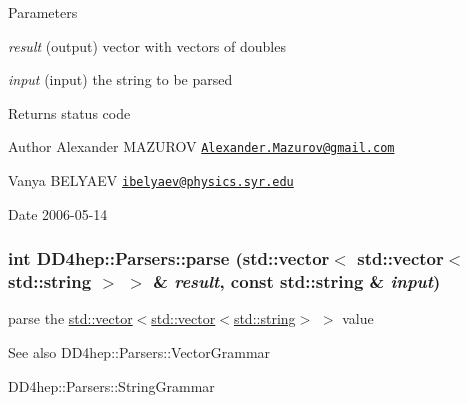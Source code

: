 \begin{DoxyParams}{Parameters}
\item[{\em result}](output) vector with vectors of doubles \item[{\em input}](input) the string to be parsed \end{DoxyParams}
\begin{DoxyReturn}{Returns}
status code
\end{DoxyReturn}
\begin{DoxyAuthor}{Author}
Alexander MAZUROV \href{mailto:Alexander.Mazurov@gmail.com}{\tt Alexander.Mazurov@gmail.com} 

Vanya BELYAEV \href{mailto:ibelyaev@physics.syr.edu}{\tt ibelyaev@physics.syr.edu} 
\end{DoxyAuthor}
\begin{DoxyDate}{Date}
2006-\/05-\/14 
\end{DoxyDate}
\hypertarget{namespace_d_d4hep_1_1_parsers_afd6bbff0d1fc52ec885e45126f670506}{
\subsubsection[{parse}]{\setlength{\rightskip}{0pt plus 5cm}int DD4hep::Parsers::parse (std::vector$<$ std::vector$<$ std::string $>$ $>$ \& {\em result}, \/  const std::string \& {\em input})}}
\label{namespace_d_d4hep_1_1_parsers_afd6bbff0d1fc52ec885e45126f670506}


parse the {\ttfamily \hyperlink{classstd_1_1vector}{std::vector}$<$\hyperlink{classstd_1_1vector}{std::vector}$<$\hyperlink{classstd_1_1string}{std::string}$>$ $>$} value \begin{DoxySeeAlso}{See also}
DD4hep::Parsers::VectorGrammar 

DD4hep::Parsers::StringGrammar 
\end{DoxySeeAlso}

